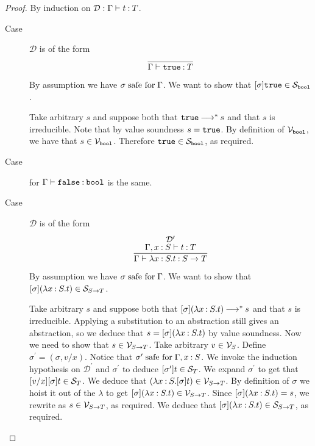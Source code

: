 \documentclass[11pt,letterpaper]{article}
\newcommand{\bool}{\mathtt{bool}}
\begin{document}
\begin{proof}
  By induction on $\mathcal{D} : \Gamma \proves t \hastype T$.
  \begin{description}
    \item[Case] $\mathcal{D}$ is of the form
      \begin{equation*}
        \infer{\Gamma \proves \true \hastype T}{}
      \end{equation*}

      By assumption we have $\sigma \safefor \Gamma$.
      We want to show that $[\sigma]\true \in \S_\bool$.

      Take arbitrary $s$ and suppose both that $\true \evalto^* s$ and that
      $s$ is irreducible.
      Note that by value soundness $s = \true$.
      By definition of $\V_\bool$, we have that $s \in \V_\bool$.
      Therefore $\true \in \S_\bool$, as required.

    \item[Case] for $\Gamma \proves \false \hastype \bool$ is the same.

    \item[Case] $\mathcal{D}$ is of the form
      \renewcommand{\t}{\ensuremath{\lambda x \hastype S . t}}
      \begin{equation*}
        \infer{\Gamma \proves \t \hastype S \to T}{
          \deduce[\mathcal{D}^\prime]{
            \Gamma, x \hastype S \proves t \hastype T
          }{}
        }
      \end{equation*}

      By assumption we have $\sigma \safefor \Gamma$.
      We want to show that
      $[\sigma](\t) \in \S_{S \to T}$.

      Take arbitrary $s$ and suppose both that $[\sigma](\t) \evalto^* s$ and
      that $s$ is irreducible.
      Applying a substitution to an abstraction still gives an abstraction, so
      we deduce that $s = [\sigma](\t)$ by value soundness.
      Now we need to show that $s \in \V_{S \to T}$.
      Take arbitrary $v \in \V_S$.
      Define $\sigma^\prime = (\sigma, v/x)$.
      Notice that $\sigma^\prime \safefor \Gamma, x \hastype S$.
      We invoke the induction hypothesis on $\mathcal{D}^\prime$ and
      $\sigma^\prime$ to deduce $[\sigma^\prime]t \in \S_T$.
      We expand $\sigma^\prime$ to get that $[v/x][\sigma]t \in \S_T$.
      We deduce that $(\lambda x \hastype S. [\sigma]t) \in \V_{S \to T}$.
      By definition of $\sigma$ we hoist it out of the $\lambda$ to get
      $[\sigma](\t) \in \V_{S \to T}$.
      Since $[\sigma](\t) = s$, we rewrite as $s \in \V_{S \to T}$,
      as required.
      We deduce that $[\sigma](\t) \in \S_{S \to T}$, as required.


\end{description}
\end{proof}
\end{document}
